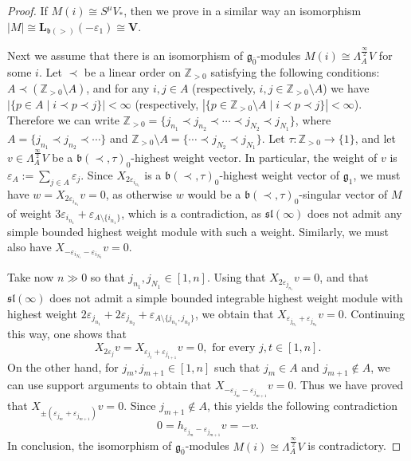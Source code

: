 \documentclass[12pt]{amsart}
\newcommand\Z{\mathbb{Z}}
\newcommand\g{\mathfrak{g}}
\newcommand\fb{\mathfrak{b}}
\newcommand\fsl{\mathfrak{sl}}
\newcommand\bV{\mathbf{V}}
\newcommand\bL{\mathbf{L}}
\theoremstyle{plain}
\theoremstyle{definition}
\numberwithin{equation}{section}
\begin{document}
\begin{proof}
If $M(i)\cong S^\mu V_*$, then we prove in a similar way an isomorphism $|M|\cong \bL_{\fb(>)} (-\varepsilon_1)\cong \bV$.

Next we assume that there is an isomorphism of $\g_{\bar 0}$-modules $M(i)\cong \Lambda^{\frac{\infty}{2}}_A V$ for some $i$. Let $\prec$ be a linear order on $\Z_{>0}$ satisfying the following conditions: $A\prec (\Z_{>0}\setminus A)$, and for any $i,j\in A$ (respectively, $i,j\in \Z_{>0}\setminus A$) we have $|\{p\in A \mid i\prec p\prec j\}|<\infty$ (respectively, $|\{p\in \Z_{>0}\setminus A \mid i\prec p\prec j\}|<\infty$). Therefore we can write $\Z_{>0} = \{ j_{n_1}\prec j_{n_2}\prec \cdots \prec j_{N_2}\prec j_{N_1} \}$, where $A = \{ j_{n_1}\prec j_{n_2}\prec \cdots \}$ and $\Z_{>0}\setminus A = \{\cdots \prec j_{N_2}\prec j_{N_1}\}$. Let $\tau:\Z_{>0}\to \{1\}$, and let $v\in \Lambda^{\frac{\infty}{2}}_A V$ be a $\fb(\prec, \tau)_0$-highest weight vector. In particular, the weight of $v$ is $\varepsilon_A:=\sum_{j\in A}\varepsilon_j$. Since $X_{2\varepsilon_{i_{n_1}}}$ is a $\fb(\prec, \tau)_0$-highest weight vector of $\g_1$, we must have $w=X_{2\varepsilon_{i_{n_1}}}v=0$, as otherwise $w$ would be a $\fb(\prec, \tau)_0$-singular vector of $M$ of weight  $3\varepsilon_{i_{n_1}} +\varepsilon_{A\setminus \{i_{n_1}\}}$, which is a contradiction, as $\fsl(\infty)$ does not admit any simple bounded highest weight module with such a weight. Similarly, we must also have $X_{-\varepsilon_{i_{N_1}} -\varepsilon_{i_{N_2}}}v=0$. 

Take now $n\gg 0$ so that $j_{n_1}, j_{N_1}\in [1,n]$. Using that $X_{2\varepsilon_{j_{n_1}}}v=0$, and that $\fsl(\infty)$ does not admit a simple bounded integrable highest weight module with highest weight $2\varepsilon_{j_{n_1}} + 2\varepsilon_{j_{n_2}} + \varepsilon_{A\setminus \{j_{n_1}, j_{n_2}\}}$, we obtain that $X_{\varepsilon_{j_{n_1}}+\varepsilon_{j_{n_2}}}v=0$. Continuing this way, one shows that
	\[
X_{2\varepsilon_{j}}v=X_{\varepsilon_{j_t}+\varepsilon_{j_{t+1}}}v=0, \text{ for every } j,t\in [1,n].
	\]
On the other hand, for $j_m, j_{m+1}\in [1,n]$ such that $j_m\in A$ and $j_{m+1}\notin A$, we can use support arguments to obtain that $X_{-\varepsilon_{j_m} - \varepsilon_{j_{m+1}}}v=0$. Thus we have proved that $X_{\pm (\varepsilon_{j_{m}}+\varepsilon_{j_{m+1}})}v=0$. Since $j_{m+1}\notin A$, this yields the following contradiction
	\[
0 = h_{\varepsilon_{j_{m}}-\varepsilon_{j_{m+1}}} v = -v.
	\]
In conclusion, the isomorphism of $\g_{\bar 0}$-modules $M(i)\cong \Lambda^{\frac{\infty}{2}}_A V$ is contradictory.



\end{proof}
\end{document}
